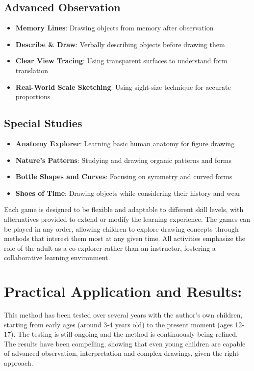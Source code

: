 \documentclass{article}
\begin{document}
\subsection{Advanced Observation}
\begin{itemize}
    \item \textbf{Memory Lines}: Drawing objects from memory after observation
    \item \textbf{Describe \& Draw}: Verbally describing objects before drawing them
    \item \textbf{Clear View Tracing}: Using transparent surfaces to understand form translation
    \item \textbf{Real-World Scale Sketching}: Using sight-size technique for accurate proportions
\end{itemize}

\subsection{Special Studies}
\begin{itemize}
    \item \textbf{Anatomy Explorer}: Learning basic human anatomy for figure drawing
    \item \textbf{Nature's Patterns}: Studying and drawing organic patterns and forms
    \item \textbf{Bottle Shapes and Curves}: Focusing on symmetry and curved forms
    \item \textbf{Shoes of Time}: Drawing objects while considering their history and wear
\end{itemize}

Each game is designed to be flexible and adaptable to different skill levels, with alternatives provided to extend or modify the learning experience. The games can be played in any order, allowing children to explore drawing concepts through methods that interest them most at any given time. All activities emphasize the role of the adult as a co-explorer rather than an instructor, fostering a collaborative learning environment.

\section{Practical Application and Results:}

This method has been tested over several years with the author’s own children, starting from early ages (around 3-4 years old) to the present moment (ages 12-17). The testing is still ongoing and the method is continuously being refined. The results have been compelling, showing that even young children are capable of advanced observation, interpretation and complex drawings, given the right approach.
\end{document}
